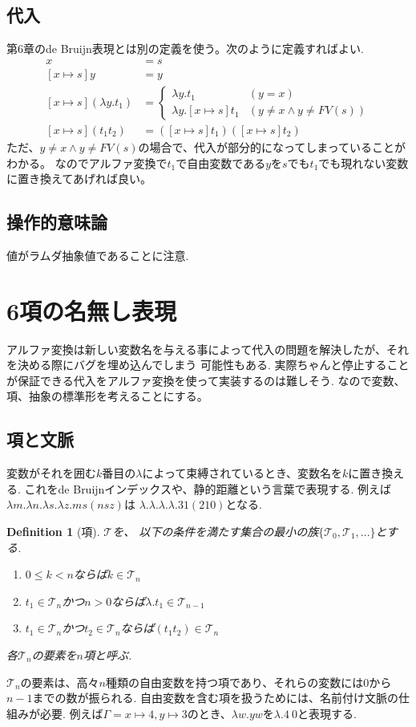 \documentclass[a4paper,10pt]{article}
\newtheorem{definition}{Definition}[section]
\begin{document}
\subsection*{代入}
第6章のde Bruijn表現とは別の定義を使う。次のように定義すればよい.
\begin{align*}
    [x \mapsto s] x  &= s \\
    [x \mapsto s] y  &= y \\
    [x \mapsto s] (\lambda y. t_1)    &= 
    \begin{cases}
        \lambda y. t_1 & (y=x)\\
        \lambda y. [x \mapsto s]t_1 & (y \neq x \land y \neq FV(s))
    \end{cases}\\
    [x \mapsto s](t_1 t_2) &= ([x \mapsto s]t_1) ([x \mapsto s]t_2)
\end{align*}
ただ、$y \neq x \land y \neq FV(s)$の場合で、代入が部分的になってしまっていることがわかる。
なのでアルファ変換で$t_1$で自由変数である$y$を$s$でも$t_1$でも現れない変数に置き換えてあげれば良い。
\subsection*{操作的意味論}
値がラムダ抽象値であることに注意.

\section*{6項の名無し表現}
アルファ変換は新しい変数名を与える事によって代入の問題を解決したが、それを決める際にバグを埋め込んでしまう
可能性もある. 実際ちゃんと停止することが保証できる代入をアルファ変換を使って実装するのは難しそう. 
なので変数、項、抽象の標準形を考えることにする。
\subsection*{項と文脈}
変数がそれを囲む$k$番目の$\lambda$によって束縛されているとき、変数名を$k$に置き換える.
これをde Bruijnインデックスや、静的距離という言葉で表現する.
例えば$\lambda m. \lambda n. \lambda s. \lambda z. m s (n s z)$は
$\lambda. \lambda. \lambda. \lambda. 3 1 (2 1 0)$となる.

\begin{definition}[項]
    $\mathcal{T}$を、
    以下の条件を満たす集合の最小の族$\{\mathcal{T}_0, \mathcal{T}_1,...\}$とする.
    \begin{enumerate}
        \item $ 0 \leq k < n$ならば$k \in \mathcal{T}_n$
        \item $t_1 \in \mathcal{T}_n$かつ$n > 0$ならば$\lambda. t_1 \in \mathcal{T}_{n-1}$
        \item $t_1 \in \mathcal{T}_n$かつ$t_2 \in \mathcal{T}_n$ならば$(t_1 t_2) \in \mathcal{T}_n$
    \end{enumerate}
    各$\mathcal{T}_n$の要素を$n$項と呼ぶ.
\end{definition}
$\mathcal{T}_n$の要素は、高々$n$種類の自由変数を持つ項であり、それらの変数には$0$から$n-1$までの数が振られる.
自由変数を含む項を扱うためには、名前付け文脈の仕組みが必要.
例えば$\Gamma = x \mapsto 4, y \mapsto 3$のとき、$\lambda w. y w$を$\lambda. 4\ 0$と表現する.
\end{document}
